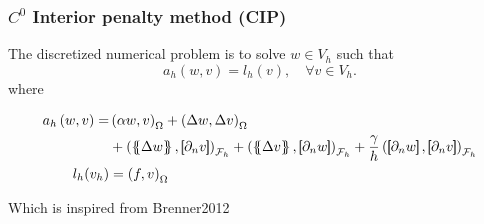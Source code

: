 \begin{frame}
\frametitle{ $C^0$ Interior penalty method (CIP) }

\begin{block}{}
The discretized numerical problem is to solve $w \in V_{h}$ such that
\begin{equation*}
\label{eq:CP_A_F}
a_{h}( w, v )   = l_{h}( v), \quad \forall v \in V_{h}  .
\end{equation*}
where

\begin{equation*}
\begin{split}
a_{h} \left( w, v \right)   =&
    \left( \alpha  w, v \right) _{\Omega }   +  \left( \Delta  w, \Delta v \right) _{\Omega } \\
 & +
  \left( \mean{  \Delta  w }, \jump{ \partial _{n }v} \right)_{\mathcal{F}_{h}}  +
 \left( \mean{ \Delta  v }, \jump{ \partial _{n}w }      \right)_{\mathcal{F}_{h}}  + \frac{\gamma }{h}  \left( \jump{ \partial _{n} w}, \jump{ \partial _{n} v   }   \right)_{\mathcal{F}_{h}} \\
 l_{h}( v_{h}) & =  \left( f, v \right) _{\Omega }
\end{split}
\end{equation*}

Which is inspired from Brenner2012 \footnotemark[1]
\end{block}


\end{frame}

